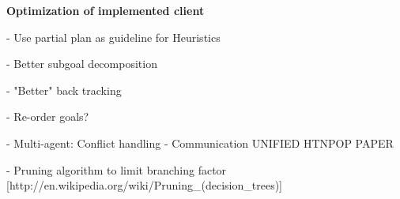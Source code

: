 \documentclass[Main]{subfiles}
\begin{document}
\textbf{Optimization of implemented client}

- Use partial plan as guideline for Heuristics

- Better subgoal decomposition

- "Better" back tracking

- Re-order goals?

- Multi-agent: Conflict handling
- Communication
UNIFIED HTNPOP PAPER


- Pruning algorithm to limit branching factor [http://en.wikipedia.org/wiki/Pruning_(decision_trees)]
\end{document}

